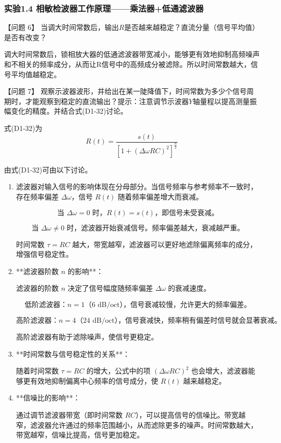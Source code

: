 \documentclass[dvipsnames, svgnames,a4paper,11pt]{article}
\begin{document}
		
	\subsubsection*{实验1.4 \quad 相敏检波器工作原理——乘法器+低通滤波器}

		【问题 6】 当调大时间常数后，输出$R$是否越来越稳定？直流分量（信号平均值）是否有改变？

		调大时间常数后，锁相放大器的低通滤波器带宽减小，能够更有效地抑制高频噪声和不相关的频率成分，从而让R信号中的高频成分被滤除。所以时间常数越大，信号平均值越稳定。


		\vspace{0.05\textwidth} %


		【问题 7】 观察示波器波形，并给出在某一陡降值下，时间常数为多少个信号周期时，才能观察到稳定的直流输出？提示：注意调节示波器$Y$轴量程以提高测量振幅变化的精度。并结合式(D1-32)讨论。

		式(D1-32)为
		\[
			R(t) = \frac{s(t)}{[1 + (\Delta\omega R C)^2]^{\frac{n}{2}}}
		\]

		由式(D1-32)可由以下讨论。

		\begin{enumerate}
			\item 滤波器对输入信号的影响体现在分母部分。当信号频率与参考频率不一致时，存在频率偏差 \( \Delta\omega \)，信号 \( R(t) \) 随着频率偏差增大而衰减。

			\[\text{当 } \Delta\omega = 0 \text{ 时，} R(t) = s(t) \text{，即信号未受衰减。}\]

			\[\text{当 } \Delta\omega \neq 0 \text{ 时，滤波器开始衰减信号。频率偏差越大，衰减越严重。}\]

			时间常数 \( \tau = RC \) 越大，带宽越窄，滤波器可以更好地滤除偏离频率的成分，增强信号稳定性。

			\item **滤波器阶数 \( n \) 的影响**：

			滤波器的阶数 \( n \) 决定了信号幅度随频率偏差 \( \Delta\omega \) 的衰减速度。

			\[\text{低阶滤波器：} n = 1 \text{（6 dB/oct），信号衰减较慢，允许更大的频率偏差。}\]

			\[\text{高阶滤波器：} n = 4 \text{（24 dB/oct），信号衰减快，频率稍有偏差时信号就会显著衰减。}\]

			高阶滤波器有助于滤除噪声，使信号更稳定。

			\item **时间常数与信号稳定性的关系**：

			随着时间常数 \( \tau = RC \) 的增大，公式中的项 \( (\Delta\omega R C)^2 \) 也会增大，滤波器能够更有效地抑制偏离中心频率的信号成分，使 \( R(t) \) 越来越稳定。

			\item **信噪比的影响**：

			通过调节滤波器带宽（即时间常数 \( RC \)），可以提高信号的信噪比。带宽越窄，滤波器允许通过的频率范围越小，从而滤除更多的噪声。时间常数越大，带宽越窄，信噪比提高，信号更加稳定。

		\end{enumerate}
\end{document}
